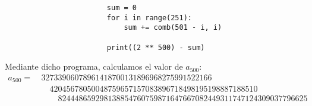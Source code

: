 \documentclass[12pt]{article}
\begin{document}
\begin{ejercicio}
\begin{enumerate}
\begin{listing}[H]
\begin{verbatim}
                        sum = 0
                        for i in range(251):
                            sum += comb(501 - i, i) 

                        print((2 ** 500) - sum)
                \end{verbatim}
            \end{listing}

            Mediante dicho programa, calculamos el valor de $a_{500}$:
            \begin{align*}
                a_{500} =~ &32733906078961418700131896968275991522166\\&\quad 42045678050048759657157083896718498195198887188510\\&\qquad 824448659298138854760759871647667082449311747124309037796625
            \end{align*}
        \end{enumerate}
    \end{ejercicio}
\end{document}
